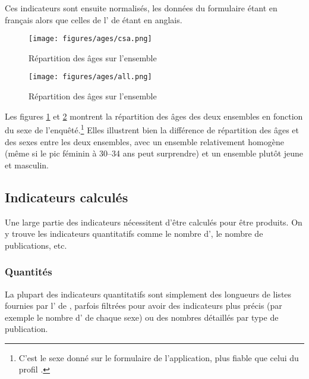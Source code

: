 Ces indicateurs sont ensuite normalisés, les données du formulaire étant en
français alors que celles de l’\api{} de \fb{} étant en anglais.

\begin{figure}[ht]
    \begin{center}
        \texttt{[image: figures/ages/csa.png]}
    \end{center}
    \caption{\label{ages-csa}Répartition des âges sur l’ensemble \csa{}}
\end{figure}

\begin{figure}[ht]
    \begin{center}
        \texttt{[image: figures/ages/all.png]}
    \end{center}
    \caption{\label{ages-all}Répartition des âges sur l’ensemble \nocsa{}}
\end{figure}

Les figures \ref{ages-csa} et \ref{ages-all} montrent la répartition des âges
des deux ensembles en fonction du sexe de l’enquêté.\footnote{C’est le sexe
donné sur le formulaire de l’application, plus fiable que celui du profil
\fb{}.} Elles illustrent bien la différence de répartition des âges et
des sexes entre les deux ensembles, avec un ensemble \csa{} relativement
homogène (même si le pic féminin à 30--34 ans peut surprendre) et un ensemble
\nocsa{} plutôt jeune et masculin.

\subsection{Indicateurs calculés}

Une large partie des indicateurs nécessitent d’être calculés pour être
produits. On y trouve les indicateurs quantitatifs comme le nombre d’, le
nombre de publications, etc.

\subsubsection{Quantités}

La plupart des indicateurs quantitatifs sont simplement des longueurs de listes
fournies par l’\api{} de \fb{}, parfois filtrées pour avoir des indicateurs
plus précis (par exemple le nombre d’ de chaque sexe) ou des
nombres détaillés par type de publication.

